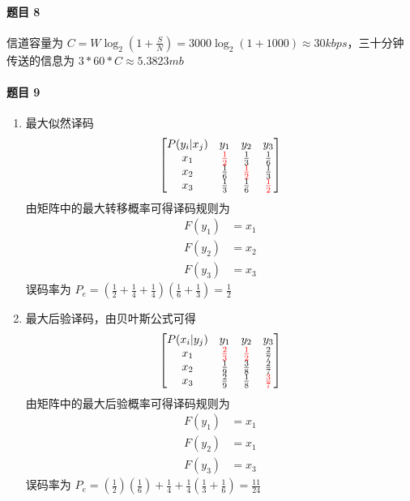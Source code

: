 \documentclass{ctexart}
\begin{document}
\paragraph{题目 8}

信道容量为 $C = W\log_2(1 + \frac{S}{N}) = 3000 \log_2(1 + 1000) \approx 30 kbps$，三十分钟传送的信息为 $3 * 60 * C \approx 5.3823 mb$

\paragraph{题目 9}

\begin{enumerate}
    \item 最大似然译码
    \begin{equation}
        \begin{bmatrix}
            P(y_i|x_j) & y_1 & y_2 & y_3 \\
            x_1 & \textcolor{red}{\frac{1}{2}} & \frac{1}{3} & \frac{1}{6} \\
            x_2 & \frac{1}{6} & \textcolor{red}{\frac{1}{2}} & \frac{1}{3} \\
            x_3 & \frac{1}{3} & \frac{1}{6} & \textcolor{red}{\frac{1}{2}} \\
        \end{bmatrix}
    \end{equation}
    由矩阵中的最大转移概率可得译码规则为
    \begin{equation}
        \begin{split}
            F(y_1) &= x_1 \\
            F(y_2) &= x_2 \\
            F(y_3) &= x_3
        \end{split}
    \end{equation}
    误码率为 $P_e = (\frac{1}{2} + \frac{1}{4} + \frac{1}{4})(\frac{1}{6} + \frac{1}{3}) = \frac{1}{2}$
    \item 最大后验译码，由贝叶斯公式可得
    \begin{equation}
        \begin{bmatrix}
            P(x_i|y_j) & y_1 & y_2 & y_3 \\
            x_1 & \textcolor{red}{\frac{2}{3}} & \textcolor{red}{\frac{1}{2}} & \frac{2}{7} \\
            x_2 & \frac{1}{9} & \frac{3}{8} & \frac{2}{7} \\
            x_3 & \frac{2}{9} & \frac{1}{8} & \textcolor{red}{\frac{3}{7}} \\
        \end{bmatrix}
    \end{equation}
    由矩阵中的最大后验概率可得译码规则为
    \begin{equation}
        \begin{split}
            F(y_1) &= x_1 \\
            F(y_2) &= x_1 \\
            F(y_3) &= x_3
        \end{split}
    \end{equation}
    误码率为 $P_e = (\frac{1}{2})(\frac{1}{6})+ \frac{1}{4} + \frac{1}{4}(\frac{1}{3} + \frac{1}{6}) = \frac{11}{24}$
\end{enumerate}
\end{document}
